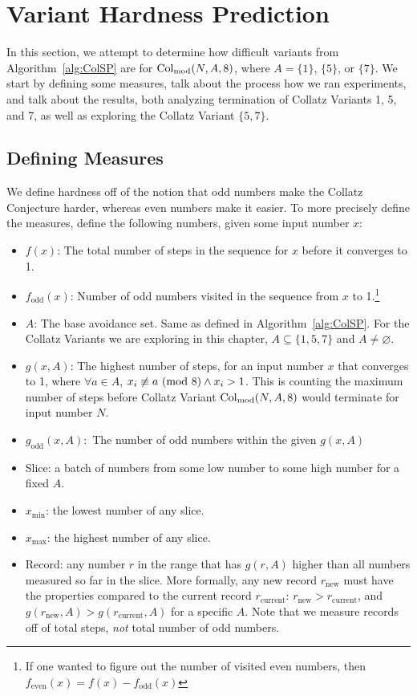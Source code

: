 \chapter{Variant Hardness Prediction} \label{sec:subhrdnspred}
In this section, we attempt to determine how difficult variants from Algorithm~\ref{alg:ColSP} are for $\mathrm{Col}_{\text{mod}}(N,A,8)$, where $A= \{1\}$, $\{5\}$, or $\{7\}$. We start by defining some measures, talk about the process how we ran experiments, and talk about the results, both analyzing termination of Collatz Variants 1, 5, and 7, as well as exploring the Collatz Variant $\{5,7\}$.
\section{Defining Measures} \label{subsec:algdefinemeasure} 
We define hardness off of the notion that odd numbers make the Collatz Conjecture harder, whereas even numbers make it easier. To more precisely define the measures, define the following numbers, given some input number $x$:
\begin{itemize}
    \item $f(x)$: The total number of steps in the sequence for $x$ before it converges to 1.
    \item $f_\text{odd}(x)$: Number of odd numbers visited in the sequence from $x$ to 1.\footnote{If one wanted to figure out the number of visited even numbers, then $f_\text{even}(x) = f(x) - f_\text{odd}(x)$} 
    \item $A$: The base avoidance set. Same as defined in Algorithm~\ref{alg:ColSP}. For the Collatz Variants we are exploring in this chapter, $A \subseteq \{1, 5, 7\}$ and $A \ne \varnothing$.
    \item $g(x,A)$: The highest number of steps, for an input number $x$ that converges to 1, where $\forall a \in A$, $x_i \not\equiv a \ (\mathrm{mod}\ 8) \wedge x_i > 1$. This is counting the maximum number of steps before Collatz Variant $\mathrm{Col}_{\text{mod}}(N,A,8)$ would terminate for input number $N$.
    \item $g_\text{odd}(x,A):$ The number of odd numbers within the given $g(x,A)$
    \item Slice: a batch of numbers from some low number to some high number for a fixed $A$.
    \item $x_{\min}$: the lowest number of any slice.
    \item $x_{\max}$: the highest number of any slice.

    \item Record: any number $r$ in the range that has $g(r,A)$ higher than all numbers measured so far in the slice. More formally, any new record $r_\text{new}$ must have the properties compared to the current record $r_\text{current}$: $r_\text{new} > r_\text{current}$, and $g(r_\text{new},A) > g(r_\text{current},A)$ for a specific $A$. Note that we measure records off of total steps, \textit{not} total number of odd numbers.
      
\end{itemize}

